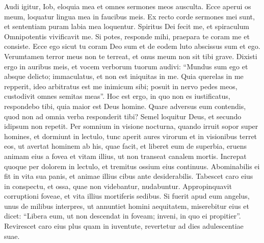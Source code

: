 \begin{biblechapter}
\begin{biblechapter}
\begin{biblechapter}
\begin{biblechapter}
\begin{biblechapter}
\begin{biblechapter}
\begin{biblechapter}
\begin{biblechapter}
\begin{biblechapter}
\begin{biblechapter}
\begin{biblechapter}
\begin{biblechapter}
\begin{biblechapter}
\begin{biblechapter}
\begin{biblechapter}
\begin{biblechapter}
\begin{biblechapter}
\begin{biblechapter}
\begin{biblechapter}
\begin{biblechapter}
\begin{biblechapter}
\begin{biblechapter}
\begin{biblechapter}
\begin{biblechapter}
\begin{biblechapter}
\begin{biblechapter}
\begin{biblechapter}
\begin{biblechapter}
\begin{biblechapter}
\begin{biblechapter}
\begin{biblechapter}
\begin{biblechapter}
\begin{biblechapter}
\verse Audi igitur, Iob, eloquia mea
 et omnes sermones meos ausculta.
 \verse Ecce aperui os meum,
 loquatur lingua mea in faucibus meis.
 \verse Ex recto corde sermones mei sunt,
 et sententiam puram labia mea loquentur.
 \verse Spiritus Dei fecit me,
 et spiraculum Omnipotentis vivificavit me.
 \verse Si potes, responde mihi,
 praepara te coram me et consiste.
 \verse Ecce ego sicut tu coram Deo sum
 et de eodem luto abscissus sum et ego.
 \verse Verumtamen terror meus non te terreat,
 et onus meum non sit tibi grave.
 \verse Dixisti ergo in auribus meis,
 et vocem verborum tuorum audivi:
 \verse “Mundus sum ego et absque delicto;
 immaculatus, et non est iniquitas in me.
 \verse Quia querelas in me repperit,
 ideo arbitratus est me inimicum sibi;
 \verse posuit in nervo pedes meos,
 custodivit omnes semitas meas”.
 \verse Hoc est ergo, in quo non es iustificatus, respondebo tibi,
 quia maior est Deus homine.
 \verse Quare adversus eum contendis,
 quod non ad omnia verba responderit tibi?
 \verse Semel loquitur Deus,
 et secundo idipsum non repetit.
 \verse Per somnium in visione nocturna,
 quando irruit sopor super homines,
 et dormiunt in lectulo,
 \verse tunc aperit aures virorum
 et in visionibus terret eos,
 \verse ut avertat hominem ab his, quae facit,
 et liberet eum de superbia,
 \verse eruens animam eius a fovea
 et vitam illius, ut non transeat canalem mortis.
 \verse Increpat quoque per dolorem in lectulo,
 et tremitus ossium eius continuus.
 \verse Abominabilis ei fit in vita sua panis,
 et animae illius cibus ante desiderabilis.
 \verse Tabescet caro eius in conspectu,
 et ossa, quae non videbantur, nudabuntur.
 \verse Appropinquavit corruptioni foveae,
 et vita illius mortiferis sedibus.
 \verse Si fuerit apud eum angelus, unus de milibus interpres,
 ut annuntiet homini aequitatem,
 \verse miserebitur eius et dicet:
 “Libera eum, ut non descendat in foveam;
 inveni, in quo ei propitier”.
 \verse Revirescet caro eius plus quam in iuventute,
 revertetur ad dies adulescentiae suae.

\end{biblechapter}
\end{biblechapter}
\end{biblechapter}
\end{biblechapter}
\end{biblechapter}
\end{biblechapter}
\end{biblechapter}
\end{biblechapter}
\end{biblechapter}
\end{biblechapter}
\end{biblechapter}
\end{biblechapter}
\end{biblechapter}
\end{biblechapter}
\end{biblechapter}
\end{biblechapter}
\end{biblechapter}
\end{biblechapter}
\end{biblechapter}
\end{biblechapter}
\end{biblechapter}
\end{biblechapter}
\end{biblechapter}
\end{biblechapter}
\end{biblechapter}
\end{biblechapter}
\end{biblechapter}
\end{biblechapter}
\end{biblechapter}
\end{biblechapter}
\end{biblechapter}
\end{biblechapter}
\end{biblechapter}
